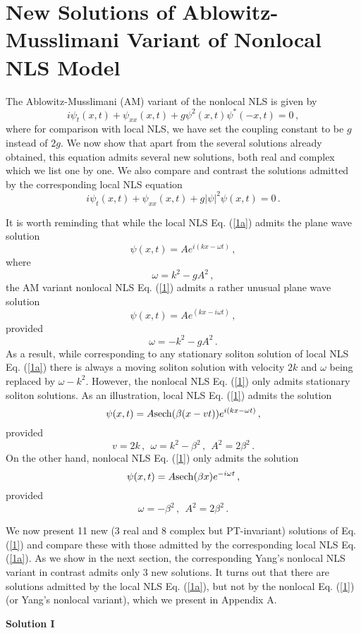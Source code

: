 \documentclass[11pt]{article}
\newcommand{\be}{\begin{equation}}
\newcommand{\ee}{\end{equation}}
\newcommand{\sech}{{\rm sech}}
\begin{document}
\section{New Solutions of Ablowitz-Musslimani Variant of Nonlocal NLS 
Model}

The Ablowitz-Musslimani (AM) variant of the nonlocal NLS is given by
\be\label{1}
i\psi_t(x,t) + \psi_{xx}(x,t) + g \psi^2(x,t) \psi^{*}(-x,t) = 0\,,
\ee
where for comparison with local NLS, we have set the coupling constant
to be $g$ instead of $2g$. 
We now show that apart from the several solutions 
already obtained, this equation admits several new solutions, both 
real and complex which we list one by one. We also compare and contrast
the solutions admitted by the corresponding local NLS equation
\be\label{1a}
i\psi_t(x,t) + \psi_{xx}(x,t) + g |\psi|^2 \psi(x,t) = 0\,.
\ee

It is worth reminding that while the local NLS Eq. (\ref{1a}) admits the 
plane wave solution
\be\label{1d}
\psi(x,t) = A e^{i(kx-\omega t)}\,,
\ee
where
\be\label{1e}
\omega = k^2 - gA^2\,,
\ee
the AM variant nonlocal NLS Eq. (\ref{1}) admits a rather unusual plane
wave solution
\be\label{1f}
\psi(x,t) = A e^{(kx-i\omega t)}\,,
\ee
provided
\be\label{1g}
\omega = -k^2 - gA^2\,.
\ee
As a result, while corresponding to any stationary soliton solution of local 
NLS Eq. (\ref{1a}) there is always a moving soliton solution with velocity
$2k$ and $\omega$ being replaced by $\omega - k^2$. However, the 
nonlocal NLS Eq. (\ref{1}) only admits stationary soliton solutions. As an
illustration, local NLS Eq. (\ref{1}) admits the solution
\be\label{1m}
\psi(x,t) = A \sech(\beta(x-vt)) e^{i(kx-\omega t)}\,,
\ee
provided
\be\label{1h}
v = 2k\,,~~\omega = k^2 -\beta^2\,,~~A^2 = 2\beta^2\,.
\ee
On the other hand, nonlocal NLS Eq. (\ref{1}) only admits the solution
\be\label{1j}
\psi(x,t) = A \sech(\beta x) e^{-i\omega t}\,,
\ee
provided
\be\label{1k}
\omega = -\beta^2\,,~~A^2 = 2\beta^2\,.
\ee

We now present 11 new (3 real and 8 complex but PT-invariant) 
solutions of Eq. (\ref{1}) and compare these with those admitted by the 
corresponding local NLS Eq. (\ref{1a}). 
 As we show in the next section, the corresponding Yang's
 nonlocal NLS variant in contrast admits only 3 new solutions. 
 It turns out that there are solutions admitted by the local
 NLS Eq. (\ref{1a}), but not by the nonlocal Eq. (\ref{1}) (or 
 Yang's nonlocal variant), which we present in Appendix A.

{\bf Solution I}
\end{document}

